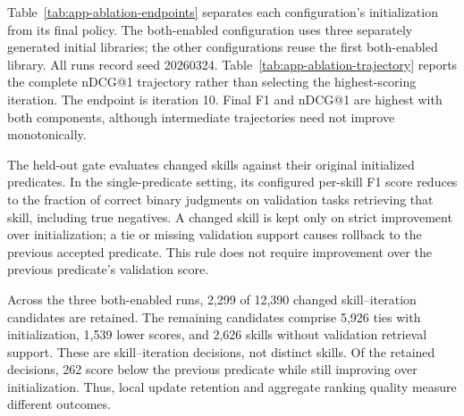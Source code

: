 Table~\ref{tab:app-ablation-endpoints} separates each configuration's initialization from its final policy. The both-enabled configuration uses three separately generated initial libraries; the other configurations reuse the first both-enabled library. All runs record seed 20260324. Table~\ref{tab:app-ablation-trajectory} reports the complete nDCG@1 trajectory rather than selecting the highest-scoring iteration. The endpoint is iteration 10. Final F1 and nDCG@1 are highest with both components, although intermediate trajectories need not improve monotonically.



The held-out gate evaluates changed skills against their original initialized predicates. In the single-predicate setting, its configured per-skill F1 score reduces to the fraction of correct binary judgments on validation tasks retrieving that skill, including true negatives. A changed skill is kept only on strict improvement over initialization; a tie or missing validation support causes rollback to the previous accepted predicate. This rule does not require improvement over the previous predicate's validation score.

Across the three both-enabled runs, 2,299 of 12,390 changed skill--iteration candidates are retained. The remaining candidates comprise 5,926 ties with initialization, 1,539 lower scores, and 2,626 skills without validation retrieval support. These are skill--iteration decisions, not distinct skills. Of the retained decisions, 262 score below the previous predicate while still improving over initialization. Thus, local update retention and aggregate ranking quality measure different outcomes.
